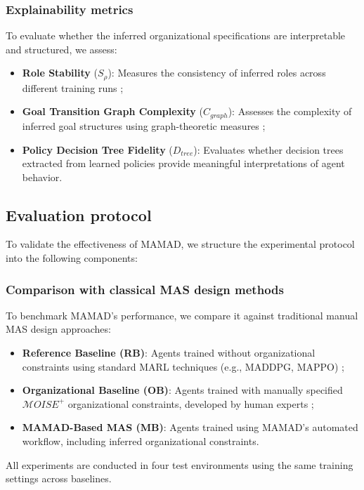 \documentclass[pdflatex,sn-mathphys-num]{sn-jnl}%
\theoremstyle{thmstyleone}%
\theoremstyle{thmstyletwo}%
\theoremstyle{thmstylethree}%
\begin{document}
\subsubsection{Explainability metrics}
To evaluate whether the inferred organizational specifications are interpretable and structured, we assess:
\begin{itemize}
    \item \textbf{Role Stability} ($S_{\rho}$): Measures the consistency of inferred roles across different training runs ;
    \item \textbf{Goal Transition Graph Complexity} ($C_{graph}$): Assesses the complexity of inferred goal structures using graph-theoretic measures ;
    \item \textbf{Policy Decision Tree Fidelity} ($D_{tree}$): Evaluates whether decision trees extracted from learned policies provide meaningful interpretations of agent behavior.
\end{itemize}

\subsection{Evaluation protocol}

To validate the effectiveness of MAMAD, we structure the experimental protocol into the following components:

\subsubsection{Comparison with classical MAS design methods}
To benchmark MAMAD's performance, we compare it against traditional manual MAS design approaches:
\begin{itemize}
    \item \textbf{Reference Baseline (RB)}: Agents trained without organizational constraints using standard MARL techniques (e.g., MADDPG, MAPPO) ;
    \item \textbf{Organizational Baseline (OB)}: Agents trained with manually specified $\mathcal{M}OISE^+$ organizational constraints, developed by human experts ;
    \item \textbf{MAMAD-Based MAS (MB)}: Agents trained using MAMAD's automated workflow, including inferred organizational constraints.
\end{itemize}

All experiments are conducted in four test environments using the same training settings across baselines.
\end{document}
